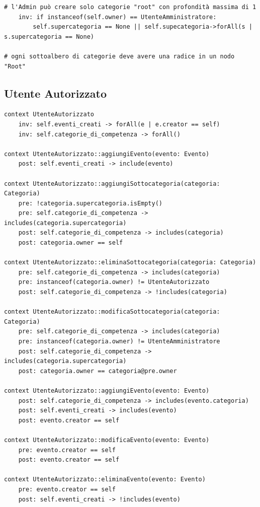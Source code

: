 \documentclass{article}
\begin{document}
\begin{verbatim}
# l'Admin può creare solo categorie "root" con profondità massima di 1
    inv: if instanceof(self.owner) == UtenteAmministratore:
        self.supercategoria == None || self.supecategoria->forAll(s | s.supercategoria == None)

# ogni sottoalbero di categorie deve avere una radice in un nodo "Root"
\end{verbatim}

\clearpage

\subsection{Utente Autorizzato}

\begin{verbatim}
context UtenteAutorizzato
    inv: self.eventi_creati -> forAll(e | e.creator == self)
    inv: self.categorie_di_competenza -> forAll()

context UtenteAutorizzato::aggiungiEvento(evento: Evento)
    post: self.eventi_creati -> include(evento)

context UtenteAutorizzato::aggiungiSottocategoria(categoria: Categoria)
    pre: !categoria.supercategoria.isEmpty()
    pre: self.categorie_di_competenza -> includes(categoria.supercategoria)
    post: self.categorie_di_competenza -> includes(categoria)
    post: categoria.owner == self

context UtenteAutorizzato::eliminaSottocategoria(categoria: Categoria)
    pre: self.categorie_di_competenza -> includes(categoria)
    pre: instanceof(categoria.owner) != UtenteAutorizzato
    post: self.categorie_di_competenza -> !includes(categoria)

context UtenteAutorizzato::modificaSottocategoria(categoria: Categoria)
    pre: self.categorie_di_competenza -> includes(categoria)
    pre: instanceof(categoria.owner) != UtenteAmministratore
    post: self.categorie_di_competenza -> includes(categoria.supercategoria)
    post: categoria.owner == categoria@pre.owner

context UtenteAutorizzato::aggiungiEvento(evento: Evento)
    post: self.categorie_di_competenza -> includes(evento.categoria)
    post: self.eventi_creati -> includes(evento)
    post: evento.creator == self

context UtenteAutorizzato::modificaEvento(evento: Evento)
    pre: evento.creator == self
    post: evento.creator == self

context UtenteAutorizzato::eliminaEvento(evento: Evento)
    pre: evento.creator == self
    post: self.eventi_creati -> !includes(evento)
\end{verbatim}
\end{document}

